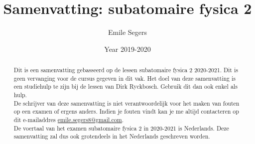 \documentclass{article}
\title{Samenvatting: subatomaire fysica 2}
\author{Emile Segers}
\date{Year 2019-2020}
\begin{document}
\maketitle

\begin{abstract}
    Dit is een samenvatting gebasseerd op de lessen subatomaire fysica 2 2020-2021. Dit is geen vervanging voor de cursus gegeven in dit vak. Het doel van deze samenvatting is een studiehulp te zijn bij de lessen van Dirk Ryckbosch. Gebruik dit dan ook enkel als hulp.\\
    De schrijver van deze samenvatting is niet verantwoordelijk voor het maken van fouten op een examen of ergens anders. Indien je fouten vindt kan je me altijd contacteren op dit e-mailaddres \href{mailto:emile.segers8@gmail.com}{emile.segers8@gmail.com}.\\
    De voertaal van het examen subatomaire fysica 2 in 2020-2021 is Nederlands. Deze samenvatting zal dus ook grotendeels in het Nederlands geschreven worden.
\end{abstract}

\tableofcontents








\end{document}
